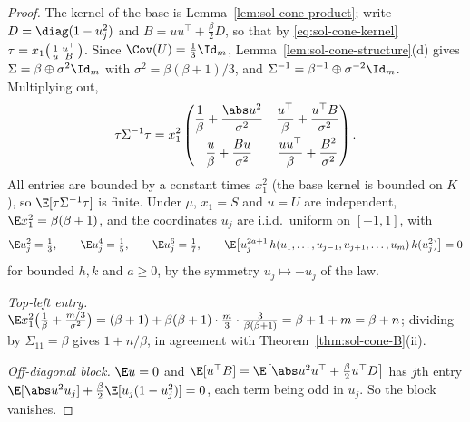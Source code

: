 \documentclass[../main.tex]{subfiles}
\begin{document}
\begin{proof}
The kernel of the base is Lemma~\ref{lem:sol-cone-product}; write $D=\diag(1-u_j^2)$ and
$B=uu^\top+\tfrac\beta2D$, so that by \eqref{eq:sol-cone-kernel}
$\tau=x_1\begin{psmallmatrix}1&u^\top\\u&B\end{psmallmatrix}$.  Since $\Cov(U)=\tfrac13\Id_m$,
Lemma~\ref{lem:sol-cone-structure}(d) gives $\Sigma=\beta\oplus\sigma^2\Id_m$ with
$\sigma^2=\beta(\beta+1)/3$, and $\Sigma^{-1}=\beta^{-1}\oplus\sigma^{-2}\Id_m$.  Multiplying
out,
\[
  \tau\Sigma^{-1}\tau
  =x_1^2\begin{pmatrix}
    \dfrac1\beta+\dfrac{\abs u^2}{\sigma^2}
    & \dfrac{u^\top}{\beta}+\dfrac{u^\top B}{\sigma^2}\\[8pt]
    \dfrac u\beta+\dfrac{Bu}{\sigma^2}
    & \dfrac{uu^\top}{\beta}+\dfrac{B^2}{\sigma^2}
  \end{pmatrix}.
\]
All entries are bounded by a constant times $x_1^2$ (the base kernel is bounded on $K$), so
$\E[\tau\Sigma^{-1}\tau]$ is finite.  Under $\mu$, $x_1=S$ and $u=U$ are independent,
$\E x_1^2=\beta(\beta+1)$, and the coordinates $u_j$ are i.i.d.\ uniform on $[-1,1]$, with
\[
  \E u_j^2=\tfrac13,\qquad \E u_j^4=\tfrac15,\qquad \E u_j^6=\tfrac17,\qquad
  \E\bigl[u_j^{2a+1}\,h(u_1,\dots,u_{j-1},u_{j+1},\dots,u_m)\,k(u_j^2)\bigr]=0
\]
for bounded $h,k$ and $a\ge0$, by the symmetry $u_j\mapsto-u_j$ of the law.

\emph{Top-left entry.}
$\E x_1^2\bigl(\tfrac1\beta+\tfrac{m/3}{\sigma^2}\bigr)=(\beta+1)+\beta(\beta+1)\cdot\tfrac m3\cdot\tfrac3{\beta(\beta+1)}
=\beta+1+m=\beta+n$; dividing by $\Sigma_{11}=\beta$ gives $1+n/\beta$, in agreement with
Theorem~\ref{thm:sol-cone-B}(ii).

\emph{Off-diagonal block.}
$\E u=0$ and $\E[u^\top B]=\E\bigl[\abs u^2u^\top+\tfrac\beta2u^\top D\bigr]$ has $j$th entry
$\E[\abs u^2u_j]+\tfrac\beta2\E[u_j(1-u_j^2)]=0$, each term being odd in $u_j$.  So the block
vanishes.


\end{proof}
\end{document}
